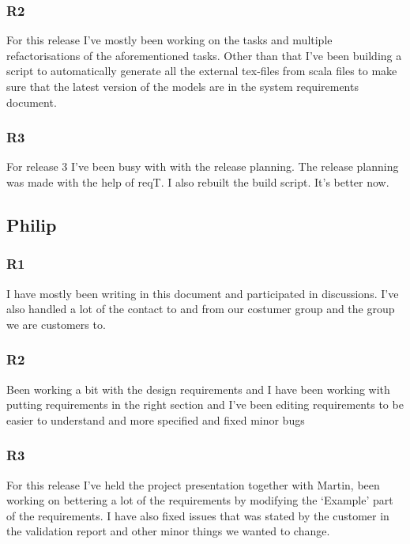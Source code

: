 \documentclass[a4paper]{article}
\begin{document}
		\subsubsection{R2}
		For this release I've mostly been working on the tasks and multiple refactorisations of the aforementioned tasks. Other than that I've been building a script to automatically generate all the external tex-files from scala files to make sure that the latest version of the models are in the system requirements document.
		\subsubsection{R3}
		For release 3 I've been busy with with the release planning. The release planning was made with the help of reqT. I also rebuilt the build script. It's better now.

	\subsection{Philip}
		\subsubsection{R1}
	I have mostly been writing in this document and participated in discussions. I've also handled a lot of the contact to and from our costumer group and the group we are customers to.
		\subsubsection{R2}
		Been working a bit with the design requirements and I have been working with putting requirements in the right section and I've been editing requirements to be easier to understand and more specified and fixed minor bugs
		\subsubsection{R3}
		For this release I've held the project presentation together with Martin, been working on bettering a lot of the requirements by modifying the `Example' part of the requirements. I have also fixed issues that was stated by the customer in the validation report and other minor things we wanted to change. 
\end{document}
